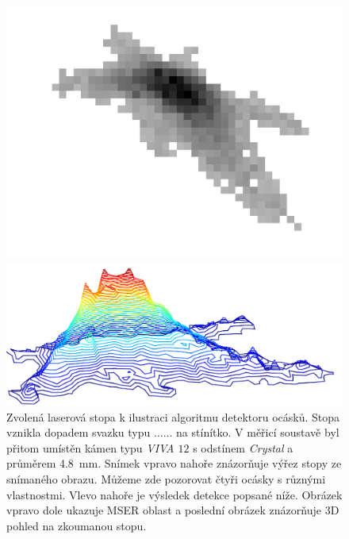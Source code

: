 \begin{figure}[htp]
\begin{minipage}[c]{0.4\textwidth}
	\includegraphics[width=\textwidth]{figures/tailex01.pdf}
	\end{minipage}
	\begin{minipage}[c]{0.4\textwidth}
	\includegraphics[width=\textwidth]{figures/tailex02.pdf}
	\end{minipage}
	
	\caption[Detektor ocásků - laserová stopa.]{Zvolená laserová stopa k ilustraci algoritmu detektoru ocásků. Stopa vznikla dopadem svazku typu $\dots \dots$ na stínítko. V měřicí soustavě byl přitom umístěn kámen typu \textit{VIVA $12$} s odstínem \textit{Crystal} a průměrem \SI{4.8}{\milli\meter}. Snímek vpravo nahoře znázorňuje výřez stopy ze snímaného obrazu. Můžeme zde pozorovat čtyři ocásky s různými vlastnostmi. Vlevo nahoře je výsledek detekce popsané níže. Obrázek vpravo dole ukazuje MSER oblast a poslední obrázek znázorňuje 3D pohled na zkoumanou stopu.}
	\label{fig:mark_tail}
	\end{figure}


